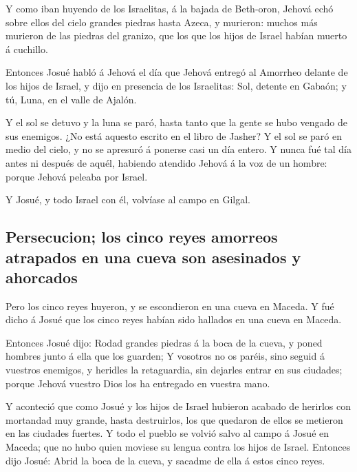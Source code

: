  Y como iban huyendo de los Israelitas, á la bajada de
Beth-oron, Jehová echó sobre ellos del cielo grandes piedras hasta
Azeca, y murieron: muchos más murieron de las piedras del granizo, que
los que los hijos de Israel habían muerto á cuchillo.

 Entonces Josué habló á Jehová el día que Jehová entregó al
Amorrheo delante de los hijos de Israel, y dijo en presencia de los
Israelitas: Sol, detente en Gabaón; y tú, Luna, en el valle de Ajalón.

 Y el sol se detuvo y la luna se paró, hasta tanto que la
gente se hubo vengado de sus enemigos. ¿No está aquesto escrito en el
libro de Jasher? Y el sol se paró en medio del cielo, y no se apresuró á
ponerse casi un día entero.  Y nunca fué tal día antes ni
después de aquél, habiendo atendido Jehová á la voz de un hombre: porque
Jehová peleaba por Israel.

 Y Josué, y todo Israel con él, volvíase al campo en
Gilgal.

\hypertarget{persecucion-los-cinco-reyes-amorreos-atrapados-en-una-cueva-son-asesinados-y-ahorcados}{%
\subsection{Persecucion; los cinco reyes amorreos atrapados en una cueva
son asesinados y
ahorcados}\label{persecucion-los-cinco-reyes-amorreos-atrapados-en-una-cueva-son-asesinados-y-ahorcados}}

 Pero los cinco reyes huyeron, y se escondieron en una
cueva en Maceda.  Y fué dicho á Josué que los cinco reyes
habían sido hallados en una cueva en Maceda.

 Entonces Josué dijo: Rodad grandes piedras á la boca de la
cueva, y poned hombres junto á ella que los guarden;  Y
vosotros no os paréis, sino seguid á vuestros enemigos, y heridles la
retaguardia, sin dejarles entrar en sus ciudades; porque Jehová vuestro
Dios los ha entregado en vuestra mano.

 Y aconteció que como Josué y los hijos de Israel hubieron
acabado de herirlos con mortandad muy grande, hasta destruirlos, los que
quedaron de ellos se metieron en las ciudades fuertes.  Y
todo el pueblo se volvió salvo al campo á Josué en Maceda; que no hubo
quien moviese su lengua contra los hijos de Israel. 
Entonces dijo Josué: Abrid la boca de la cueva, y sacadme de ella á
estos cinco reyes.

